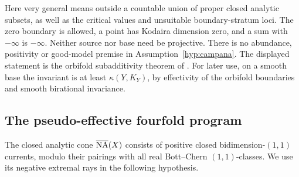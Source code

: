Here very general means outside a countable union of proper closed
analytic subsets, as well as the critical values and unsuitable
boundary-stratum loci. The zero boundary is allowed, a point has
Kodaira dimension zero, and a sum with \(-\infty\) is
\(-\infty\). Neither source nor base need be projective. There is
no abundance, positivity or good-model premise in
Assumption~\ref{hyp:campana}. The displayed statement is the orbifold
subadditivity theorem of \cite[Theorem~1.1]{GrantCampana}. For later use,
on a smooth base the invariant
is at least \(\kappa(Y,K_Y)\), by effectivity of the orbifold
boundaries and smooth birational invariance.

\subsection{The pseudo-effective fourfold program}

The closed analytic cone \(\overline{\mathrm{NA}}(X)\) consists of positive closed
bidimension-\((1,1)\) currents, modulo their pairings with all real
Bott--Chern \((1,1)\)-classes. We use its negative extremal rays in
the following hypothesis.

